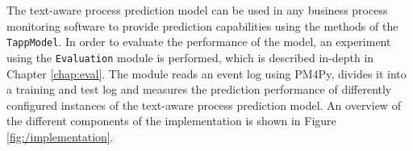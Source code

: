 The text-aware process prediction model can be used in any business process monitoring software to provide prediction capabilities using the methods of the \texttt{TappModel}.
In order to evaluate the performance of the model, an experiment using the \texttt{Evaluation} module is performed, which is described in-depth in Chapter \ref{chap:eval}.
The module reads an event log using PM4Py, divides it into a training and test log and measures the prediction performance of differently configured instances of the text-aware process prediction model.
An overview of the different components of the implementation is shown in Figure \ref{fig:/implementation}.